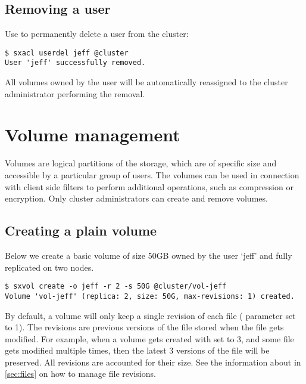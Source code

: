 \subsection{Removing a user}
Use  to permanently delete a user from the cluster:
\begin{lstlisting}
$ sxacl userdel jeff @cluster
User 'jeff' successfully removed.
\end{lstlisting}
All volumes owned by the user will be automatically reassigned to the
cluster administrator performing the removal.

\section{Volume management} \label{sec:volumes}
Volumes are logical partitions of the \SX storage, which are of
specific size and accessible by a particular group of users. The
volumes can be used in connection with client side filters to perform
additional operations, such as compression or encryption.
Only cluster administrators can create and remove volumes.

\subsection{Creating a plain volume}
Below we create a basic volume of size 50GB owned by the user `jeff' and fully replicated on two nodes.
\begin{lstlisting}
$ sxvol create -o jeff -r 2 -s 50G @cluster/vol-jeff
Volume 'vol-jeff' (replica: 2, size: 50G, max-revisions: 1) created.
\end{lstlisting}
By default, a volume will only keep a single revision of each file (
parameter set to 1). The revisions are previous versions of the file stored when the file
gets modified. For example, when a volume gets created with  set to
3, and some file gets modified multiple times, then the latest 3 versions of the file will
be preserved. All revisions are accounted for their size. See the information about
 in {\ifpdf{}\else\ref{sec:files}\fi} on how to manage file
revisions.

